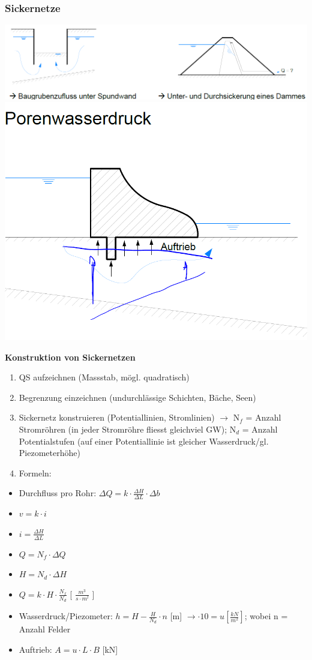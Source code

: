 
	\begin{minipage}{\linewidth}
		
		\subsubsection{Sickernetze}
		
		\includegraphics[width=0.6\linewidth]{images/GW15Sickerwassermenge.PNG}
		\includegraphics[width=0.2\linewidth]{images/GW16Porenwasserdruck.PNG}		\\
	\end{minipage}
\begin{minipage}{0.5\linewidth}
		
		\textbf{Konstruktion von Sickernetzen}
		\begin{enumerate}
			\item QS aufzeichnen (Massstab, mögl. quadratisch)
			\item Begrenzung einzeichnen (undurchlässige Schichten, Bäche, Seen)
			\item Sickernetz konstruieren (Potentiallinien, Stromlinien)
					$ \rightarrow $ N$_f$ = Anzahl Stromröhren (in jeder Stromröhre fliesst gleichviel GW); N$_d$ = Anzahl Potentialstufen (auf einer Potentiallinie ist gleicher Wasserdruck/gl. Piezometerhöhe)
			\item Formeln:			
		\end{enumerate}
		\begin{itemize}
			\item Durchfluss pro Rohr: $ \Delta Q = k \cdot \frac{\Delta H}{\Delta L} \cdot \Delta b $
			\item $ v = k \cdot i $
			\item $ i = \frac{\Delta H}{\Delta L} $
			\item $ Q = N_f \cdot \Delta Q $
			\item $ H = N_d \cdot \Delta H $
			\item $ Q = k \cdot H \cdot \frac{N_f}{N_d} $ [ $ \frac{m^3}{s \cdot m^l} $ ]
			\item Wasserdruck/Piezometer: $ h = H - \frac{H}{N_d} \cdot n $ [m] $ \rightarrow \cdot 10 = u [\frac{kN}{m^2}] $; wobei n = Anzahl Felder
			\item Auftrieb: $ A = u \cdot L \cdot B $ [kN]
		\end{itemize}
	
\end{minipage}

